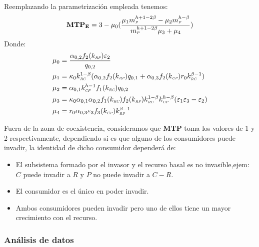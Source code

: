 Reemplazando la parametrizaci\'on empleada tenemos:
\begin{equation}
  \mathbf{MTP_E} = 3 - \mu_0  ( \frac{\mu_1m_{\textit{\tiny P}}^{h +1-2\beta} - \mu_2 m_{\textit{\tiny P}}^{h-\beta}}{m_{\textit{\tiny P}}^{h+1 -2\beta}\mu_3 + \mu_4} )
\end{equation}
Donde:
\begin{equation}
  \begin{aligned}
    \mu_0 &= \frac{ \alpha_{0,2} f_2(k_{\textit{\tiny RP}}) \varepsilon_2}{q_{0,2}} \\
    \mu_1 &= \kappa_0k_{\textit{\tiny RC}}^{1-\beta}(\alpha_{0,2} f_2(k_{\textit{\tiny RP}}) q_{0,1} + \alpha_{0,3} f_2(k_{\textit{\tiny CP}})r_0 k_{\textit{\tiny RC}}^{\beta-1}) \\
    \mu_2 &= \alpha_{0,1} k_{\textit{\tiny CP}}^{h-1} f_1(k_{\textit{\tiny RC}}) q_{0,2}\\
    \mu_3 &= \kappa_0\alpha_{0,1}\alpha_{0,2} f_1(k_{\textit{\tiny RC}}) f_2(k_{\textit{\tiny RP}}) k_{\textit{\tiny RC}}^{1-\beta}k_{\textit{\tiny CP}}^{h-\beta} (\varepsilon_1\varepsilon_3 - \varepsilon_2) \\
    \mu_4 &= r_0 \alpha_{0,3} \varepsilon_3 f_3(k_{\textit{\tiny CP}}) k_{\textit{\tiny RP}}^{\beta - 1}
  \end{aligned}
\end{equation}


Fuera de la zona de coexistencia, consideramos que \textbf{MTP} toma los valores de 1 y 2 respectivamente, dependiendo si es que alguno de los consumidores puede invadir, la identidad de dicho consumidor depender\'a de: 
\begin{itemize}
\item El subsistema formado por el invasor y el recurso basal es no invasible,ejem: $C$ puede invadir a $R$ y $P$ no puede invadir a $C-R$.
\item El consumidor es el \'unico en poder invadir.
\item Ambos consumidores pueden invadir pero uno de ellos tiene un mayor crecimiento con el recurso.
\end{itemize}

\subsubsection{An\'alisis de datos}
